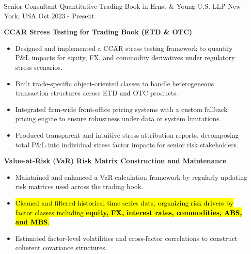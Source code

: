 

\begin{cventries}


\cventry
{Senior Consultant} %
{Quantitative Trading Book in Ernst \& Young U.S. LLP} %
{New York, USA} %
{Oct 2023 - Present} %
{
  \begin{cvitems}
    \item \textbf{CCAR Stress Testing for Trading Book (ETD \& OTC)}
    \begin{itemize}
      \item Designed and implemented a CCAR stress testing framework to quantify P\&L impacts for {equity, FX, and commodity} derivatives under regulatory stress scenarios.
      \item Built {trade-specific object-oriented classes} to handle heterogeneous transaction structures across ETD and OTC products.
      \item Integrated firm-wide front-office pricing systems with a {custom fallback pricing engine} to ensure robustness under data or system limitations.
      \item Produced transparent and intuitive {stress attribution reports}, decomposing total P\&L into individual stress factor impacts for senior risk stakeholders.
    \end{itemize}
    \item \textbf{Value-at-Risk (VaR) Risk Matrix Construction and Maintenance}
    \begin{itemize}
      \item Maintained and enhanced a VaR calculation framework by regularly updating {risk matrices} used across the trading book.
      \item \hl{Cleaned and filtered historical time series data, organizing risk drivers by factor classes including \textbf{equity, FX, interest rates, commodities, ABS, and MBS}.}
      \item Estimated factor-level {volatilities and cross-factor correlations} to construct coherent covariance structures.

\end{itemize}
\end{cvitems}}
\end{cventries}
